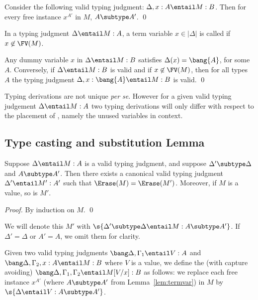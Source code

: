 \documentclass{llncs}
\begin{document}
\begin{lemma}\label{lem:termvar}
  Consider the following valid typing judgment: $\Delta,x:A\entail
  M:B$. Then for every free instance $x^{A'}$ in $M$, $A\subtype A'$.
  \qed
\end{lemma}

\begin{definition}\rm
  In a typing judgment $\Delta\entail M:A$, a term variable
  $x\in|\Delta|$ is called  if $x\not\in\FV(M)$.
\end{definition}

\begin{lemma}\label{lem:dummydup}
  Any dummy variable $x$ in $\Delta\entail M:B$ satisfies
  $\Delta(x)=\bang{A}$,
  for some $A$. Conversely, if $\Delta\entail
  M:B$ is valid and if $x\not\in\FV(M)$, then for all types $A$ the
  typing judgment $\Delta,x:\bang{A}\entail M:B$ is valid.
  \qed
\end{lemma}

Typing derivations are not unique {\it per se}. However for a given
valid typing judgement $\Delta\entail M:A$ two typing derivations will
only differ with respect to the placement of ,
namely the unused variables in context.



\subsection{Type casting and substitution Lemma}

\begin{lemma}
\label{lem:typecastvalue}
  Suppose $\Delta\entail M:A$ is a valid typing judgment, and suppose
  $\Delta'\subtype\Delta$ and $A\subtype A'$. Then there exists a
  canonical valid typing judgment $\Delta'\entail M':A'$ such that
  $\Erase(M)=\Erase(M')$. Moreover, if $M$ is a value, so is $M'$.
\end{lemma}

\begin{proof}
  By induction on $M$. \qed
\end{proof}


We will denote this $M'$ with $\s{\Delta'\subtype\Delta\entail
M:A\subtype A'}$. If $\Delta'=\Delta$ or $A'=A$, we omit
them for clarity.



\begin{definition}\label{def:subst}\rm
  Given two valid typing judgments $\bang\Delta,\Gamma_1\entail
  V:A$ and $\bang\Delta,\Gamma_2,x:A\entail M:B$ where $V$ is a value,
  we define the  (with capture avoiding)
  $\bang\Delta,\Gamma_1,\Gamma_2\entail M[V/x]:B$ as follows:
  we replace each free instance $x^{A'}$ (where $A\subtype A'$
  from Lemma~\ref{lem:termvar}) in $M$ by
  $\s{\Delta\entail V:A\subtype A'}$.
\end{definition}
\end{document}
